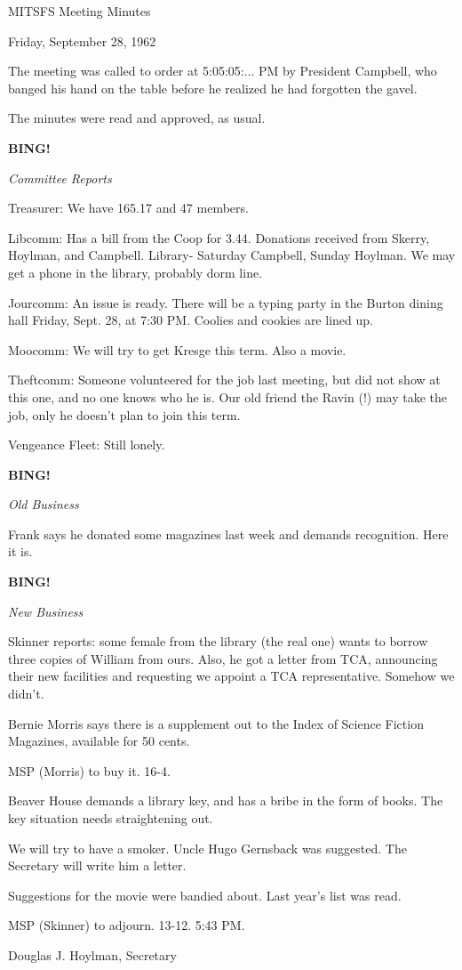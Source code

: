 \documentclass[12pt]{article}
\newcommand{\bing}{{\bf BING!} }
\newcommand{\goto}[1]{\bing \vskip 12pt \centerline{{\em{#1}}}}
\begin{document}
\begin{center}

MITSFS Meeting Minutes

Friday, September 28, 1962

\end{center}
 
\vspace{12pt}

\setlength{\parskip}{6pt}

\noindent
The meeting was called to order at 5:05:05:... PM by President Campbell, who banged his hand on the table before he realized he had forgotten the gavel.

The minutes were read and approved, as usual.

\goto{Committee Reports}

Treasurer: We have 165.17 and 47 members.

Libcomm: Has a bill from the Coop for 3.44. Donations received from Skerry, Hoylman, and Campbell. Library- Saturday Campbell, Sunday Hoylman. We may get a phone in the library, probably dorm line.

Jourcomm: An issue is ready. There will be a typing party in the Burton dining hall Friday, Sept. 28, at 7:30 PM. Coolies and cookies are lined up.

Moocomm: We will try to get Kresge this term. Also a movie.

Theftcomm: Someone volunteered for the job last meeting, but did not show at this one, and no one knows who he is. Our old friend the Ravin (!) may take the job, only he doesn't plan to join this term.

Vengeance Fleet: Still lonely.

\goto{Old Business}

Frank says he donated some magazines last week and demands recognition. Here it is.

\goto{New Business}

Skinner reports: some female from the library (the real one) wants to borrow three copies of William from ours. Also, he got a letter from TCA, announcing their new facilities and requesting we appoint a TCA representative. Somehow we didn't.

Bernie Morris says there is a supplement out to the Index of Science Fiction Magazines, available for 50 cents.

MSP (Morris) to buy it. 16-4.

Beaver House demands a library key, and has a bribe in the form of books. The key situation needs straightening out.

We will try to have a smoker. Uncle Hugo Gernsback was suggested. The Secretary will write him a letter.

Suggestions for the movie were bandied about. Last year's list was read.

MSP (Skinner) to adjourn. 13-12. 5:43 PM.

\vspace{12pt}

\centerline{Douglas J. Hoylman, Secretary}
\end{document}
